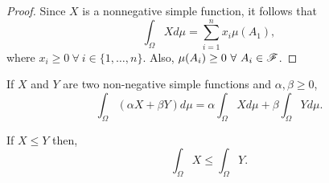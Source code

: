 \documentclass[../TGMAFFIRO.tex]{subfiles}
\begin{document}
\begin{proof}
	Since $X$ is a nonnegative simple function, it follows that
	\[
	\int_\Omega X d\mu = \sum_{i=1}^n x_i \mu(A_1),
	\]
	where $x_i \geq 0 \ \forall \ i \in \{1, \ldots, n\}$. Also, $\mu(A_i) \geq 0 \ \forall \ A_i \in \mathscr{F}$.
\end{proof}

\begin{theorem}
	If $X$ and $Y$ are two non-negative simple functions and $\alpha, \beta \geq 0$,
	\begin{equation}
		\int_\Omega (\alpha X + \beta Y) d\mu = \alpha\int_\Omega X d\mu + \beta\int_\Omega Y d\mu.
	\end{equation}
	
	If $X \leq Y$ then,
	\begin{equation}
		\int_\Omega X \leq \int_\Omega Y.
	\end{equation} 
\end{theorem}
\end{document}
